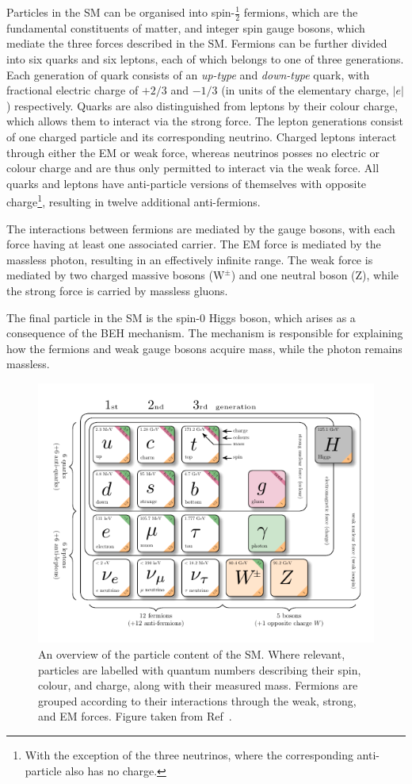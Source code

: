 Particles in the SM can be organised into spin-$\frac{1}{2}$ fermions, which are the fundamental constituents of matter, and integer spin gauge bosons, which mediate the three forces described in the SM. Fermions can be further divided into six quarks and six leptons, each of which belongs to one of three generations. Each generation of quark consists of an \textit{up-type} and \textit{down-type} quark, with fractional electric charge of $+2/3$ and $-1/3$ (in units of the elementary charge, $|e|$) respectively. Quarks are also distinguished from leptons by their colour charge, which allows them to interact via the strong force. The lepton generations consist of one charged particle and its corresponding neutrino. Charged leptons interact through either the EM or weak force, whereas neutrinos posses no electric or colour charge and are thus only permitted to interact via the weak force. All quarks and leptons have anti-particle versions of themselves with opposite charge\footnote{With the exception of the three neutrinos, where the corresponding anti-particle also has no charge.}, resulting in twelve additional anti-fermions. %

The interactions between fermions are mediated by the gauge bosons, with each force having at least one associated carrier. The EM force is mediated by the massless photon, resulting in an effectively infinite range. The weak force is mediated by two charged massive bosons ($\mathrm{W}^{\pm}$) and one neutral boson ($\mathrm{Z}$), while the strong force is carried by massless gluons. 

The final particle in the SM is the spin-0 Higgs boson, which arises as a consequence of the BEH mechanism. The mechanism is responsible for explaining how the fermions and weak gauge bosons acquire mass, while the photon remains massless. 

\begin{figure}[htbp!]
\centering
\includegraphics[width =0.85\linewidth]{Figures/Theory/standard_model.pdf}\hfill
\caption[The particle content of the SM.]{An overview of the particle content of the SM. Where relevant, particles are labelled with quantum numbers describing their spin, colour, and charge, along with their measured mass. Fermions are grouped according to their interactions through the weak, strong, and EM forces. Figure taken from Ref~\cite{shane_thesis}.}
\label{fig:the_sm}
\end{figure}


